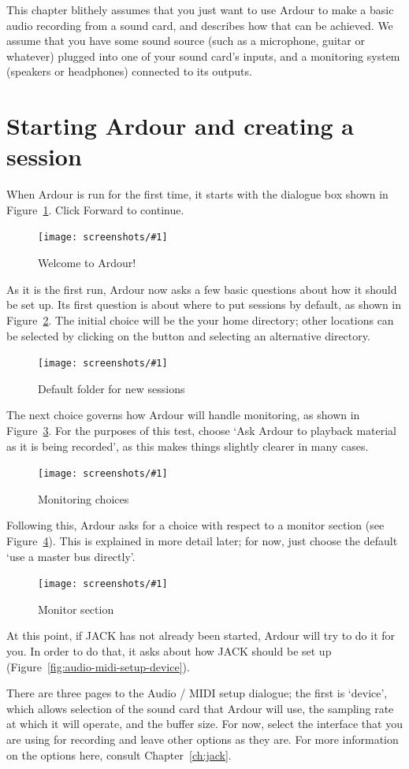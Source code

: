 \documentclass[10pt,a4paper]{book}
\newcommand{\button}[1]{#1}
\newcommand{\screenshot}[3]{%
\begin{figure}[ht]%
\begin{center}
\texttt{[image: screenshots/\#1]}
\end{center}
\caption{#2}
\label{#3}
\end{figure}}
\begin{document}
This chapter blithely assumes that you just want to use Ardour to make
a basic audio recording from a sound card, and describes how that can
be achieved.  We assume that you have some sound source (such as a
microphone, guitar or whatever) plugged into one of your sound card's
inputs, and a monitoring system (speakers or headphones) connected to
its outputs.


\section{Starting Ardour and creating a session}

When Ardour is run for the first time, it starts with the dialogue box
shown in Figure~\ref{fig:welcome-to-ardour}.  Click \button{Forward} to continue.

\screenshot{welcome-to-ardour.png}{Welcome to Ardour!}{fig:welcome-to-ardour}

As it is the first run, Ardour now asks a few basic questions about
how it should be set up.  Its first question is about where to put
sessions by default, as shown in
Figure~\ref{fig:default-folder-for-new-sessions}.  The initial choice
will be the your home directory; other locations can be selected by
clicking on the button and selecting an alternative directory.

\screenshot{default-folder-for-new-sessions.png}{Default folder for new sessions}{fig:default-folder-for-new-sessions}

The next choice governs how Ardour will handle monitoring, as shown in
Figure~\ref{fig:monitoring-choices}.  For the purposes of this test,
choose `Ask Ardour to playback material as it is being recorded', as
this makes things slightly clearer in many cases.

\screenshot{monitoring-choices.png}{Monitoring choices}{fig:monitoring-choices}

Following this, Ardour asks for a choice with respect to a monitor
section (see Figure~\ref{fig:monitor-section}).  This is explained in
more detail later; for now, just choose the default `use a master bus
directly'.

\screenshot{monitor-section.png}{Monitor section}{fig:monitor-section}

At this point, if JACK has not already been started, Ardour will try
to do it for you.  In order to do that, it asks about how JACK should
be set up (Figure~\ref{fig:audio-midi-setup-device}).

There are three pages to the Audio / MIDI setup dialogue; the first is
`device', which allows selection of the sound card that Ardour will
use, the sampling rate at which it will operate, and the buffer size.
For now, select the interface that you are using for recording and
leave other options as they are.  For more information on the options
here, consult Chapter~\ref{ch:jack}.
\end{document}
